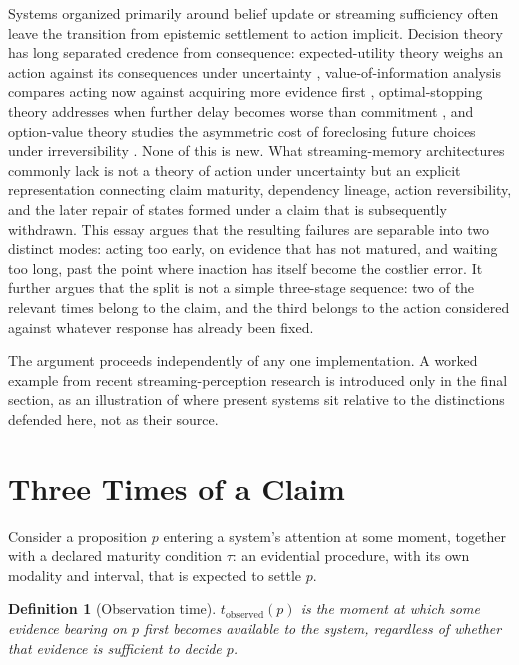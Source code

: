 \documentclass[11pt]{article}
\newtheorem{definition}{Definition}
\begin{document}
Systems organized primarily around belief update or streaming sufficiency often leave the transition from epistemic settlement to action implicit. Decision theory has long separated credence from consequence: expected-utility theory weighs an action against its consequences under uncertainty \cite{Savage1954}, value-of-information analysis compares acting now against acquiring more evidence first \cite{Howard1966}, optimal-stopping theory addresses when further delay becomes worse than commitment \cite{ChowRobbinsSiegmund1971}, and option-value theory studies the asymmetric cost of foreclosing future choices under irreversibility \cite{DixitPindyck1994}. None of this is new. What streaming-memory architectures commonly lack is not a theory of action under uncertainty but an explicit representation connecting claim maturity, dependency lineage, action reversibility, and the later repair of states formed under a claim that is subsequently withdrawn. This essay argues that the resulting failures are separable into two distinct modes: acting too early, on evidence that has not matured, and waiting too long, past the point where inaction has itself become the costlier error. It further argues that the split is not a simple three-stage sequence: two of the relevant times belong to the claim, and the third belongs to the action considered against whatever response has already been fixed.

The argument proceeds independently of any one implementation. A worked example from recent streaming-perception research is introduced only in the final section, as an illustration of where present systems sit relative to the distinctions defended here, not as their source.

\section{Three Times of a Claim}

Consider a proposition $p$ entering a system's attention at some moment, together with a declared maturity condition $\tau$: an evidential procedure, with its own modality and interval, that is expected to settle $p$.

\begin{definition}[Observation time]
$t_{\mathrm{observed}}(p)$ is the moment at which some evidence bearing on $p$ first becomes available to the system, regardless of whether that evidence is sufficient to decide $p$.
\end{definition}
\end{document}
